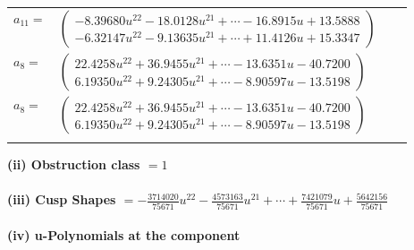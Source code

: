 \documentclass[1p]{elsarticle_modified}
\theoremstyle{definition}
\begin{document}
\begin{tabular}{m{7pt} m{180pt} m{7pt} m{180pt} }
\flushright $a_{11}=$&$\begin{pmatrix}-8.39680 u^{22}-18.0128 u^{21}+\cdots-16.8915 u+13.5888\\-6.32147 u^{22}-9.13635 u^{21}+\cdots+11.4126 u+15.3347\end{pmatrix}$ \\
\flushright $a_{8}=$&$\begin{pmatrix}22.4258 u^{22}+36.9455 u^{21}+\cdots-13.6351 u-40.7200\\6.19350 u^{22}+9.24305 u^{21}+\cdots-8.90597 u-13.5198\end{pmatrix}$\\ \flushright $a_{8}=$&$\begin{pmatrix}22.4258 u^{22}+36.9455 u^{21}+\cdots-13.6351 u-40.7200\\6.19350 u^{22}+9.24305 u^{21}+\cdots-8.90597 u-13.5198\end{pmatrix}$\\&\end{tabular}
\flushleft \textbf{(ii) Obstruction class $= 1$}\\~\\
\flushleft \textbf{(iii) Cusp Shapes $= -\frac{3714020}{75671} u^{22}-\frac{4573163}{75671} u^{21}+\cdots+\frac{7421079}{75671} u+\frac{5642156}{75671}$}\\~\\
\newpage\renewcommand{\arraystretch}{1}
\flushleft \textbf{(iv) u-Polynomials at the component}\newline \\
\end{document}
